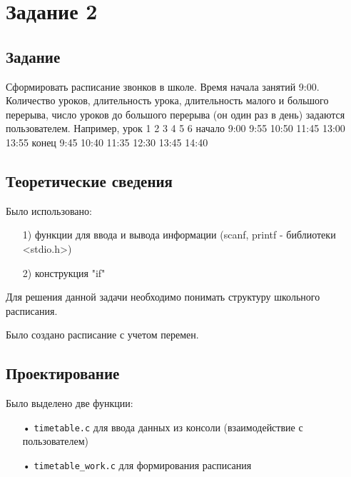 \documentclass[12pt,a4paper]{report}
\begin{document}
\section{Задание 2}
\subsection{Задание}

Сформировать расписание звонков в школе. Время начала занятий 9:00. Количество уроков, длительность урока, длительность малого и большого перерыва, число уроков до большого перерыва (он один раз в день) задаются пользователем. Например,
урок    1    2     3     4     5     6
начало 9:00 9:55 10:50 11:45 13:00 13:55
конец 9:45 10:40 11:35 12:30 13:45 14:40

\subsection{Теоретические сведения}

Было использовано:
\begin{enumerate}
\item[1)] функции для ввода и вывода информации (scanf, printf - библиотеки <stdio.h>)

\item[2)] конструкция "if"
\end{enumerate}

Для решения данной задачи необходимо понимать структуру школьного расписания.

Было создано расписание с учетом перемен.

\subsection{Проектирование}

Было выделено две функции:
\begin{enumerate}
\item[•] \verb-timetable.c- для ввода данных из консоли (взаимодействие с пользователем)
\item[•] \verb-timetable_work.c- для формирования расписания
\end{enumerate}
\end{document}
